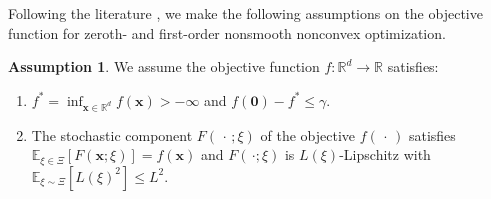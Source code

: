 \documentclass{article}
\def\vzero{{\bm{0}}}
\def\vg{{\bm{g}}}
\def\vx{{\bm{x}}}
\def\vy{{\bm{y}}}
\def\sR{{\mathbb{R}}}
\newcommand{\E}{\mathbb{E}}
\theoremstyle{definition}
\newtheorem{asm}{Assumption}[section]
\theoremstyle{remark}
\begin{document}
	
	Following the literature \citep{duchi2012randomized,chen2023faster,liu2024quantum,lin2022gradient,kornowski2024algorithm,zhang2020complexity,tian2022finite,cutkosky2023optimal}, we make the following assumptions on the objective function for zeroth- and first-order nonsmooth nonconvex optimization.
	
	\begin{asm} \label{asm:Lip}
		We assume the objective function $f:\sR^d \rightarrow \sR$ satisfies:
		\begin{enumerate}
			\item[(a)] $f^* = \inf_{\vx \in \sR^d} f(\vx) > -\infty$ and $f(\vzero) -  f^* \le \gamma$.
			\item[(b)]  The stochastic component $F(\,\cdot\,; \xi)$ of the objective $f(\,\cdot\,)$ satisfies $ \E_{\xi \in \Xi}[F(\vx; \xi)] = f(\vx)$ and $F(\,\cdot;\xi)$ is $L(\xi)$-Lipschitz with $\E_{\xi \sim \Xi}[L(\xi)^2 ] \le L^2$.
		\end{enumerate}
	\end{asm}
	
	
	
	
\end{document}
